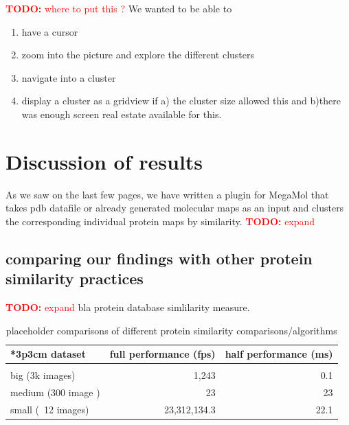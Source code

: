 \documentclass[journal]{vgtc}       %
\newcommand{\todo}[1]{\textcolor{red}{\textbf{TODO:} #1}}
\begin{document}
\todo{where to put this ?}
We wanted to be able to 
\begin{enumerate}
  \item have a cursor 
  \item zoom into the picture and  explore the different clusters
  \item navigate into a cluster
  \item display a cluster as a gridview if a) the cluster size allowed this and b)there was enough screen real estate available for this.
  
\end{enumerate}


\section{Discussion of results}
As we saw on the last few pages, we have written a plugin for MegaMol that takes pdb datafile or already generated molecular maps as an input and clusters  the corresponding individual protein maps by similarity. \todo{expand}

\subsection{comparing our findings with other protein similarity practices}\label{subsec:comparison}
\todo{expand} bla \cite{3dsurfer} protein database simlilarity measure.


\begin{table}
  \caption{
  \label{tab:perf} placeholder comparisons of different protein similarity comparisons/algorithms}
  \centering
  \vspace{0.3em}
  \begin{tabular}{lrr}{*{3}{p{3cm}}}
  dataset & full performance (fps) & half performance (ms)\\ \hline\\[-0.4em]
  big (3k images) & 1,243 & 0.1 \\
  medium (300 image ) & 23 & 23 \\
  small (~12 images) & 23,312,134.3 & 22.1 \\
  \end{tabular}
  \end{table}
\end{document}
